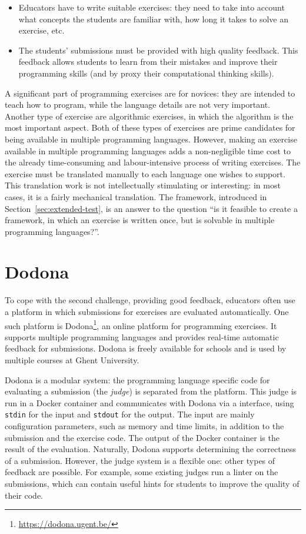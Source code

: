 \documentclass[5p,number]{elsarticle}
\begin{document}
    \begin{itemize}
        \item Educators have to write suitable exercises: they need to take into account what concepts the students are familiar with, how long it takes to solve an exercise, etc.
        \item The students' submissions must be provided with high quality feedback.
        This feedback allows students to learn from their mistakes and improve their programming skills (and by proxy their computational thinking skills).
    \end{itemize}
    
    A significant part of programming exercises are for novices: they are intended to teach how to program, while the language details are not very important.
    Another type of exercise are algorithmic exercises, in which the algorithm is the most important aspect.
    Both of these types of exercises are prime candidates for being available in multiple programming languages.
    However, making an exercise available in multiple programming languages adds a non-negligible time cost to the already time-consuming and labour-intensive process of writing exercises.
    The exercise must be translated manually to each language one wishes to support.
    This translation work is not intellectually stimulating or interesting: in most cases, it is a fairly mechanical translation.
    The \tested framework, introduced in Section~\ref{sec:extended-test}, is an answer to the question ``is it feasible to create a framework, in which an exercise is written once, but is solvable in multiple programming languages?''.

    \section{Dodona}\label{sec:extended-dodona}
    
    To cope with the second challenge, providing good feedback, educators often use a platform in which submissions for exercises are evaluated automatically.
    One such platform is Dodona\footnote{\url{https://dodona.ugent.be/}}, an online platform for programming exercises.
    It supports multiple programming languages and provides real-time automatic feedback for submissions.
    Dodona is freely available for schools and is used by multiple courses at Ghent University.

    Dodona is a modular system: the programming language specific code for evaluating a submission (the \emph{judge}) is separated from the platform.
    This judge is run in a Docker container and communicates with Dodona via a  interface, using \texttt{stdin} for the input and \texttt{stdout} for the output.
    The input are mainly configuration parameters, such as memory and time limits, in addition to the submission and the exercise code.
    The output of the Docker container is the result of the evaluation.
    Naturally, Dodona supports determining the correctness of a submission.
    However, the judge system is a flexible one: other types of feedback are possible.
    For example, some existing judges run a linter on the submissions, which can contain useful hints for students to improve the quality of their code.
    
\end{document}
